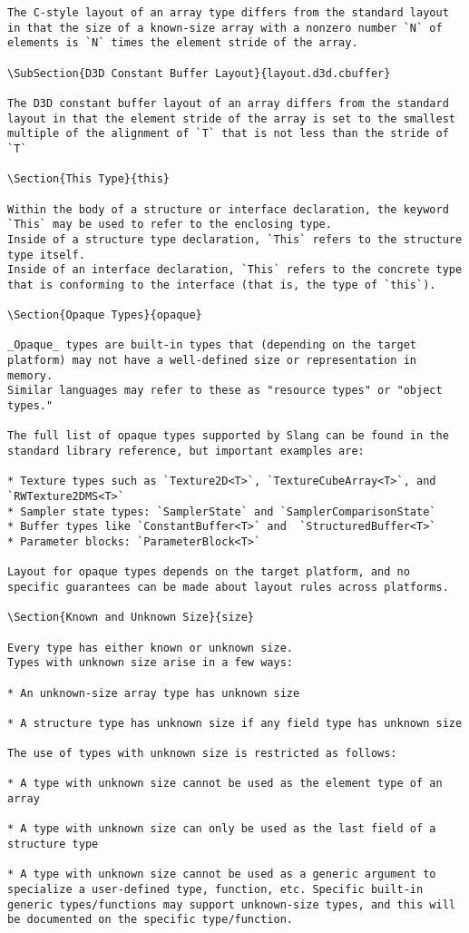 \begin{verbatim}
The C-style layout of an array type differs from the standard layout in that the size of a known-size array with a nonzero number `N` of elements is `N` times the element stride of the array.

\SubSection{D3D Constant Buffer Layout}{layout.d3d.cbuffer}

The D3D constant buffer layout of an array differs from the standard layout in that the element stride of the array is set to the smallest multiple of the alignment of `T` that is not less than the stride of `T`

\Section{This Type}{this}

Within the body of a structure or interface declaration, the keyword `This` may be used to refer to the enclosing type.
Inside of a structure type declaration, `This` refers to the structure type itself.
Inside of an interface declaration, `This` refers to the concrete type that is conforming to the interface (that is, the type of `this`).

\Section{Opaque Types}{opaque}

_Opaque_ types are built-in types that (depending on the target platform) may not have a well-defined size or representation in memory.
Similar languages may refer to these as "resource types" or "object types."

The full list of opaque types supported by Slang can be found in the standard library reference, but important examples are:

* Texture types such as `Texture2D<T>`, `TextureCubeArray<T>`, and `RWTexture2DMS<T>`
* Sampler state types: `SamplerState` and `SamplerComparisonState`
* Buffer types like `ConstantBuffer<T>` and  `StructuredBuffer<T>`
* Parameter blocks: `ParameterBlock<T>`

Layout for opaque types depends on the target platform, and no specific guarantees can be made about layout rules across platforms.

\Section{Known and Unknown Size}{size}

Every type has either known or unknown size.
Types with unknown size arise in a few ways:

* An unknown-size array type has unknown size

* A structure type has unknown size if any field type has unknown size

The use of types with unknown size is restricted as follows:

* A type with unknown size cannot be used as the element type of an array

* A type with unknown size can only be used as the last field of a structure type

* A type with unknown size cannot be used as a generic argument to specialize a user-defined type, function, etc. Specific built-in generic types/functions may support unknown-size types, and this will be documented on the specific type/function.
\end{verbatim}